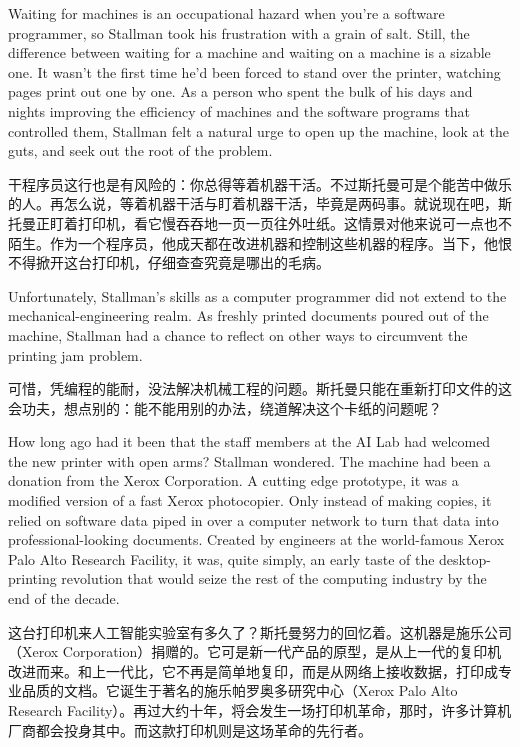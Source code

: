 \ifdefined\eng
Waiting for machines is an occupational hazard when you're a software programmer, so Stallman took his frustration with a grain of salt. Still, the difference between waiting for a machine and waiting on a machine is a sizable one. It wasn't the first time he'd been forced to stand over the printer, watching pages print out one by one. As a person who spent the bulk of his days and nights improving the efficiency of machines and the software programs that controlled them, Stallman felt a natural urge to open up the machine, look at the guts, and seek out the root of the problem.
\fi

\ifdefined\chs
干程序员这行也是有风险的：你总得等着机器干活。不过斯托曼可是个能苦中做乐的人。再怎么说，等着机器干活与盯着机器干活，毕竟是两码事。就说现在吧，斯托曼正盯着打印机，看它慢吞吞地一页一页往外吐纸。这情景对他来说可一点也不陌生。作为一个程序员，他成天都在改进机器和控制这些机器的程序。当下，他恨不得掀开这台打印机，仔细查查究竟是哪出的毛病。
\fi

\ifdefined\eng
Unfortunately, Stallman's skills as a computer programmer did not extend to the mechanical-engineering realm. As freshly printed documents poured out of the machine, Stallman had a chance to reflect on other ways to circumvent the printing jam problem.
\fi

\ifdefined\chs
可惜，凭编程的能耐，没法解决机械工程的问题。斯托曼只能在重新打印文件的这会功夫，想点别的：能不能用别的办法，绕道解决这个卡纸的问题呢？
\fi

\ifdefined\eng
How long ago had it been that the staff members at the AI Lab had welcomed the new printer with open arms? Stallman wondered. The machine had been a donation from the Xerox Corporation. A cutting edge prototype, it was a modified version of a fast Xerox photocopier. Only instead of making copies, it relied on software data piped in over a computer network to turn that data into professional-looking documents. Created by engineers at the world-famous Xerox Palo Alto Research Facility, it was, quite simply, an early taste of the desktop-printing revolution that would seize the rest of the computing industry by the end of the decade.
\fi

\ifdefined\chs
这台打印机来人工智能实验室有多久了？斯托曼努力的回忆着。这机器是施乐公司（Xerox Corporation）捐赠的。它可是新一代产品的原型，是从上一代的复印机改进而来。和上一代比，它不再是简单地复印，而是从网络上接收数据，打印成专业品质的文档。它诞生于著名的施乐帕罗奥多研究中心（Xerox Palo Alto Research Facility）。再过大约十年，将会发生一场打印机革命，那时，许多计算机厂商都会投身其中。而这款打印机则是这场革命的先行者。
\fi

